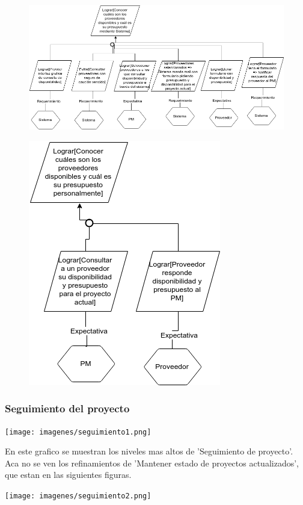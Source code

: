\begin{figure}[H]
    \centering
    \includegraphics[width=\textwidth]{imagenes/objetivos-seleccion-mejor-proveedor-3.png}
\end{figure}

\begin{figure}[H]
    \centering
    \includegraphics[width=.5\textwidth]{imagenes/objetivos-seleccion-mejor-proveedor-4.png}
\end{figure}

\subsubsection{Seguimiento del proyecto}

\texttt{[image: imagenes/seguimiento1.png]}

En este grafico se muestran los niveles mas altos de 'Seguimiento de proyecto'. Aca no se ven los refinamientos de 'Mantener estado de proyectos actualizados', que estan en las siguientes figuras.

\texttt{[image: imagenes/seguimiento2.png]}

